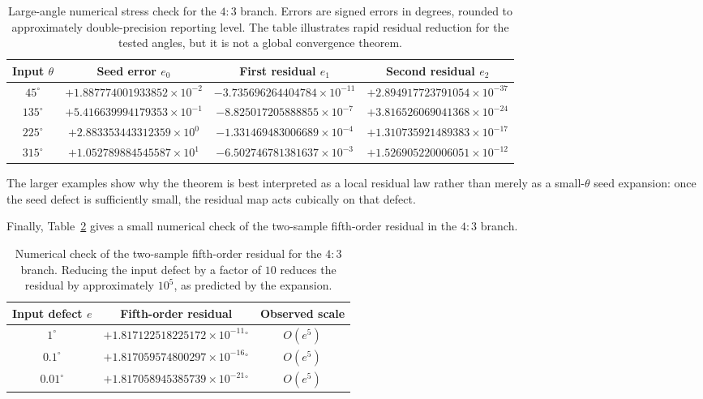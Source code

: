 \documentclass[11pt]{article}
\theoremstyle{definition}
\theoremstyle{remark}
\begin{document}
\begin{table}[htbp]
\centering
\scriptsize
\setlength{\tabcolsep}{4pt}
\begin{tabular}{@{}cccc@{}}
\toprule
Input $\theta$ & Seed error $e_0$ & First residual $e_1$ & Second residual $e_2$ \\
\midrule
$45^\circ$  & $+1.887774001933852\times 10^{-2}$ & $-3.735696264404784\times 10^{-11}$ & $+2.894917723791054\times 10^{-37}$ \\
$135^\circ$ & $+5.416639994179353\times 10^{-1}$ & $-8.825017205888855\times 10^{-7}$  & $+3.816526069041368\times 10^{-24}$ \\
$225^\circ$ & $+2.883353443312359\times 10^{0}$  & $-1.331469483006689\times 10^{-4}$  & $+1.310735921489383\times 10^{-17}$ \\
$315^\circ$ & $+1.052789884545587\times 10^{1}$  & $-6.502746781381637\times 10^{-3}$  & $+1.526905220006051\times 10^{-12}$ \\
\bottomrule
\end{tabular}
\caption{Large-angle numerical stress check for the $4:3$ branch.  Errors are
signed errors in degrees, rounded to approximately double-precision reporting
level.  The table illustrates rapid residual reduction for the tested angles,
but it is not a global convergence theorem.}
\label{tab:large-angle-stress}
\end{table}

The larger examples show why the theorem is best interpreted as a local
residual law rather than merely as a small-$\theta$ seed expansion: once the
seed defect is sufficiently small, the residual map acts cubically on that
defect.

Finally, Table~\ref{tab:two-sample-fifth-order-check} gives a small numerical
check of the two-sample fifth-order residual in the $4:3$ branch.

\begin{table}[htbp]
\centering
\scriptsize
\setlength{\tabcolsep}{6pt}
\begin{tabular}{@{}ccc@{}}
\toprule
Input defect $e$ & Fifth-order residual & Observed scale \\
\midrule
$1^\circ$   & $+1.817122518225172\times 10^{-11}\!^\circ$ & $O(e^5)$ \\
$0.1^\circ$ & $+1.817059574800297\times 10^{-16}\!^\circ$ & $O(e^5)$ \\
$0.01^\circ$ & $+1.817058945385739\times 10^{-21}\!^\circ$ & $O(e^5)$ \\
\bottomrule
\end{tabular}
\caption{Numerical check of the two-sample fifth-order residual for the $4:3$
branch.  Reducing the input defect by a factor of $10$ reduces the residual by
approximately $10^5$, as predicted by the expansion.}
\label{tab:two-sample-fifth-order-check}
\end{table}
\end{document}
